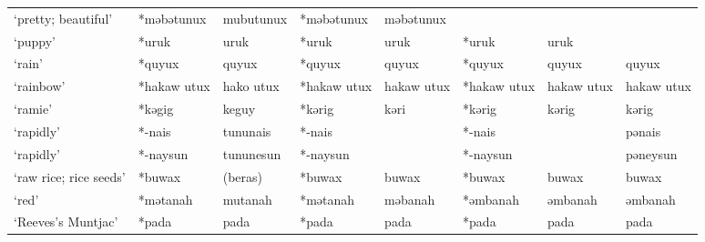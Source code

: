\begin{landscape}
\begin{longtable}[c]{@{}p{3cm}<{\raggedright}p{2.75cm}<{\raggedright}p{2.75cm}<{\raggedright}p{2.75cm}<{\raggedright}p{2.75cm}<{\raggedright}p{2.75cm}<{\raggedright}p{2.75cm}<{\raggedright}p{2.75cm}<{\raggedright}@{}}
`pretty; beautiful'                                  & *məbətunux         & mubutunux                      & *məbətunux         & məbətunux                  &                  &                          &                                   \\
`puppy'                                              & *uruk              & uruk                           & *uruk              & uruk                       & *uruk            & uruk                     &                                   \\
`rain'                                               & *quyux             & quyux                          & *quyux             & quyux                      & *quyux           & quyux                    & quyux                             \\
`rainbow'                                            & *hakaw utux        & hako utux                      & *hakaw utux        & hakaw utux                 & *hakaw utux      & hakaw utux               & hakaw utux                        \\
`ramie'                                              & *kəgig             & keguy                          & *kərig             & kəri                       & *kərig           & kərig                    & kərig                             \\
`rapidly'                                            & *-nais             & tununais                       & *-nais             &                            & *-nais           &                          & pənais                            \\
`rapidly'                                            & *-naysun           & tununesun                      & *-naysun           &                            & *-naysun         &                          & pəneysun                          \\
`raw rice; rice seeds'                               & *buwax             & (beras)                        & *buwax             & buwax                      & *buwax           & buwax                    & buwax                             \\
`red'                                                & *mətanah           & mutanah                        & *mətanah           & məbanah                    & *əmbanah         & əmbanah                  & əmbanah                           \\
`Reeves's Muntjac'                                   & *pada              & pada                           & *pada              & pada                       & *pada            & pada                     & pada                              \\

\end{longtable}
\end{landscape}
